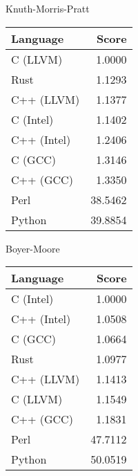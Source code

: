 \begin{subtable}{0.33\textwidth}
    \centering
    \caption{Knuth-Morris-Pratt}
    \label{table:runtime:kmp}
    \begin{tabular}{|l|r|}
        \hline
        Language & Score \\
        \hline
        C (LLVM) & 1.0000 \\
        Rust & 1.1293 \\
        C++ (LLVM) & 1.1377 \\
        C (Intel) & 1.1402 \\
        C++ (Intel) & 1.2406 \\
        C (GCC) & 1.3146 \\
        C++ (GCC) & 1.3350 \\
        Perl & 38.5462 \\
        Python & 39.8854 \\
        \hline
    \end{tabular}
\end{subtable}%
\begin{subtable}{0.33\textwidth}
    \centering
    \caption{Boyer-Moore}
    \label{table:runtime:boyer_moore}
    \begin{tabular}{|l|r|}
        \hline
        Language & Score \\
        \hline
        C (Intel) & 1.0000 \\
        C++ (Intel) & 1.0508 \\
        C (GCC) & 1.0664 \\
        Rust & 1.0977 \\
        C++ (LLVM) & 1.1413 \\
        C (LLVM) & 1.1549 \\
        C++ (GCC) & 1.1831 \\
        Perl & 47.7112 \\
        Python & 50.0519 \\
        \hline
    \end{tabular}
\end{subtable}%

